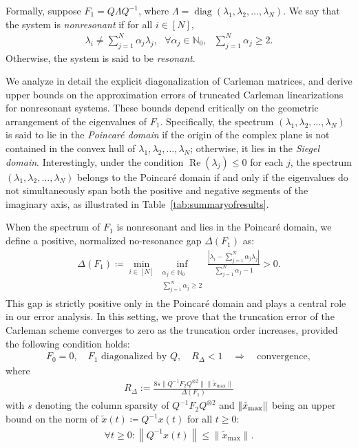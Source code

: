 \documentclass[superscriptaddress,onecolumn,nofootinbib,longbibliography,a4paper,accepted=2026-09-29]{quantumarticle}
\theoremstyle{plain}
\theoremstyle{definition}
\numberwithin{thm}{section}
\numberwithin{assumption}{section}
\numberwithin{lemma}{section}
\numberwithin{prop}{section}
\numberwithin{cor}{section}
\numberwithin{definition}{section}
\numberwithin{rmk}{section}
\numberwithin{equation}{section}
\newcommand{\abs}[1]      {\left| #1 \right|}
\newcommand{\norm}[1]     {\left\| #1 \right\|}
\newcommand{\mx}{\mathrm{max}}
\newcommand{\myN}{\mathbb{N}}
\newcommand{\lrb}[1]{\left ( #1 \right )}
\newcommand{\defeq}{\coloneqq}
\newcommand{\realpart}[1]{\operatorname{Re}\lrb{#1}}
\newcommand{\diag}[1]{\operatorname{diag}\lrb{#1}}
\begin{document}
Formally, suppose $F_1=Q \Lambda Q^{-1}$, where $\Lambda=\diag{\lambda_1, \lambda_2, \dots, \lambda_N}$. We say that the system is \emph{nonresonant} if for all $i \in [N]$, 
\begin{align}
\lambda_i \neq \sum_{j=1}^N \alpha_j \lambda_j,~~~\forall \alpha_j \in \myN_0,~~~\sum_{j=1}^N \alpha_j \ge 2.    
\end{align}
Otherwise, the system is said to be \emph{resonant}. 

We analyze in detail the explicit diagonalization of Carleman matrices, and derive upper bounds on the approximation errors of truncated Carleman linearizations for nonresonant systems. These bounds depend critically on  the geometric arrangement of the eigenvalues of $F_1$. Specifically, the spectrum $(\lambda_1, \lambda_2, \dots, \lambda_N)$ is said to lie in
the \emph{Poincar\'{e} domain} if the origin of the complex plane is not contained in the convex hull of $\lambda_1, \lambda_2, \dots, \lambda_N$; otherwise, it lies in the \emph{Siegel domain}. Interestingly, under the condition $\realpart{\lambda_j}\le 0$ for each $j$, the spectrum $(\lambda_1, \lambda_2, \dots, \lambda_N)$ belongs to the Poincar\'{e} domain if and only if the eigenvalues do not simultaneously span both the positive and negative segments of the imaginary axis, as illustrated in Table~\ref{tab:summaryofresults}.

When the spectrum of $F_1$ is nonresonant and lies in the Poincar\'{e} domain, we define a positive, normalized no-resonance gap $\Delta(F_1)$ as:
\begin{align}
\Delta(F_1)\defeq \min_{i \in [N]} \inf_{\substack{\alpha_j \in \myN_0 \\ \sum_{j=1}^N \alpha_j \ge 2}} \frac{\abs{\lambda_i-\sum_{j=1}^N \alpha_j\lambda_j}}{\sum_{j=1}^N \alpha_j-1} > 0. 
\label{eq:def_noramlized_no_resonance_gap_intro}
\end{align}
This gap is strictly positive only in the Poincar\'{e} domain and plays a central role in our error analysis. In this setting, we prove that the truncation error of the Carleman scheme converges to zero as the truncation order increases, provided the following condition holds:   
\begin{align}
F_0=0, \quad F_1\textrm{~diagonalized~by~} Q,\quad R_\Delta<1 \quad\Rightarrow\quad \textrm{convergence},    
\end{align}
where
\begin{align}
    R_\Delta:=  \frac{8s \|Q^{-1}F_2Q^{\otimes 2}\| \|\tilde{x}_{\mathrm{max}}\|}{\Delta(F_1)}
\end{align}
with $s$ denoting the column sparsity of $Q^{-1}F_2Q^{\otimes 2}$ and $\norm{\tilde{x}_{\rm max}}$ being an upper bound on the norm of $\tilde{x}(t) \defeq Q^{-1}x(t)$ for all $t \ge 0$:
\begin{align}
    \forall t \ge 0: \norm{Q^{-1} x(t)}\leq \norm{\tilde{x}_{\mx}}.    
\end{align}
\end{document}
